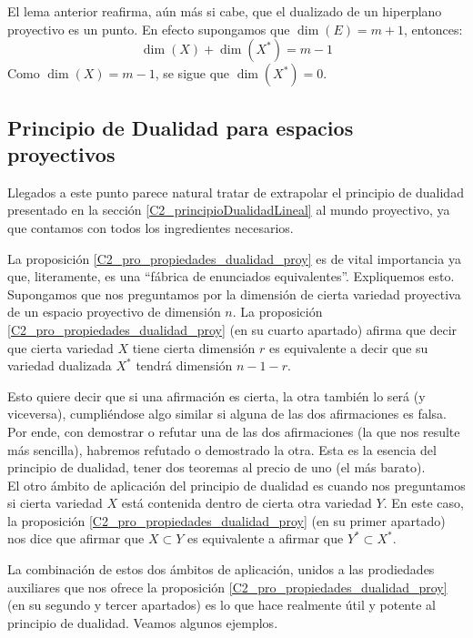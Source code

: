 \begin{obs}
	El lema anterior reafirma, aún más si cabe, que el dualizado de un hiperplano proyectivo es un punto. En efecto supongamos que $\dim(E)=m+1$, entonces:
	\begin{equation*}
	\dim(X)+\dim(X^*)=m-1
	\end{equation*}
	Como $\dim(X)=m-1$, se sigue que $\dim(X^*)=0$.
\end{obs}

\subsection{Principio de Dualidad para espacios proyectivos}
\label{C2_principioDualidadProyectiva}
Llegados a este punto parece natural tratar de extrapolar el principio de dualidad presentado en la sección \ref{C2_principioDualidadLineal} al mundo proyectivo, ya que contamos con todos los ingredientes necesarios.

La proposición \ref{C2_pro_propiedades_dualidad_proy} es de vital importancia ya que, literamente, es una ``fábrica de enunciados equivalentes''. Expliquemos esto.\\

Supongamos que nos preguntamos por la dimensión de cierta variedad proyectiva de un espacio proyectivo de dimensión $n$. La proposición \ref{C2_pro_propiedades_dualidad_proy} (en su cuarto apartado) afirma que decir que cierta variedad $X$ tiene cierta dimensión $r$ es equivalente a decir que su variedad dualizada $X^*$ tendrá dimensión $n-1-r$.

Esto quiere decir que si una afirmación es cierta, la otra también lo será (y viceversa), cumpliéndose algo similar si alguna de las dos afirmaciones es falsa. Por ende, con demostrar o refutar una de las dos afirmaciones (la que nos resulte más sencilla), habremos refutado o demostrado la otra. Esta es la esencia del principio de dualidad, tener dos teoremas al precio de uno (el más barato).\\

El otro ámbito de aplicación del principio de dualidad es cuando nos preguntamos si cierta variedad $X$ está contenida dentro de cierta otra variedad $Y$. En este caso, la proposición \ref{C2_pro_propiedades_dualidad_proy} (en su primer apartado) nos dice que afirmar que $X\subset Y$ es equivalente a afirmar que $Y^*\subset X^*$.

La combinación de estos dos ámbitos de aplicación, unidos a las prodiedades auxiliares que nos ofrece la proposición \ref{C2_pro_propiedades_dualidad_proy} (en su segundo y tercer apartados) es lo que hace  realmente útil y potente al principio de dualidad. Veamos algunos ejemplos.

